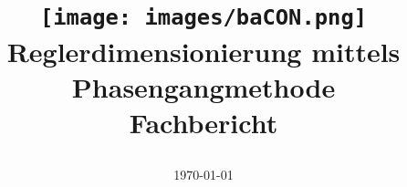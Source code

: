 \title{%
    \vspace{25mm}
    \texttt{[image: images/baCON.png]} \\
    \vspace{20mm}
    \large{Reglerdimensionierung mittels Phasengangmethode} \\
    \vspace{10mm}
    \large{Fachbericht}
    \date{\today}
}
